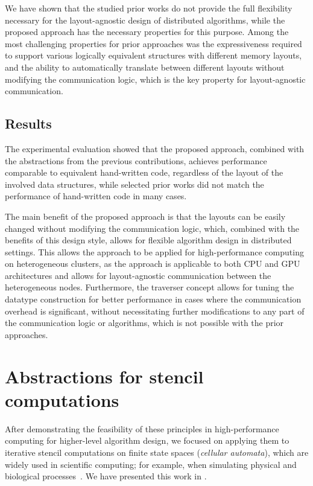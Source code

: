 We have shown that the studied prior works do not provide the full flexibility necessary for the layout-agnostic design of distributed algorithms, while the proposed approach has the necessary properties for this purpose. Among the most challenging properties for prior approaches was the expressiveness required to support various logically equivalent structures with different memory layouts, and the ability to automatically translate between different layouts without modifying the communication logic, which is the key property for layout-agnostic communication.


\subsection{Results}\label{sec:layout-agnostic-results}

The experimental evaluation showed that the proposed approach, combined with the abstractions from the previous contributions, achieves performance comparable to equivalent hand-written code, regardless of the layout of the involved data structures, while selected prior works did not match the performance of hand-written code in many cases.

The main benefit of the proposed approach is that the layouts can be easily changed without modifying the communication logic, which, combined with the benefits of this design style, allows for flexible algorithm design in distributed settings. This allows the approach to be applied for high-performance computing on heterogeneous clusters, as the approach is applicable to both CPU and GPU architectures and allows for layout-agnostic communication between the heterogeneous nodes. Furthermore, the traverser concept allows for tuning the datatype construction for better performance in cases where the communication overhead is significant, without necessitating further modifications to any part of the communication logic or algorithms, which is not possible with the prior approaches.


\section{Abstractions for stencil computations}\label{sec:stencil-computations}

After demonstrating the feasibility of these principles in high-performance computing for higher-level algorithm design, we focused on applying them to iterative stencil computations on finite state spaces (\emph{cellular automata}), which are widely used in scientific computing; for example, when simulating physical and biological processes~\cite{mohebbi2020implementation,babu2021modeling,valentim2023cellular}. We have presented this work in .


